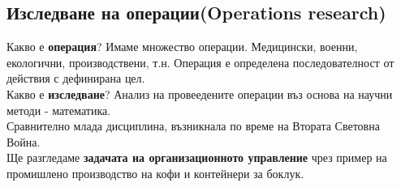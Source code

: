\documentclass[12pt, a4paper]{article}
\begin{document}
\subsection*{Изследване на операции(Operations research)}
Какво е \textbf{операция}? Имаме множество операции. Медицински, военни, екологични, производствени, т.н. Операция е определена последователност от действия с дефинирана цел.\\
Какво е \textbf{изследване}? Анализ на провеедените операции въз основа на научни методи - математика.\\
Сравнително млада дисциплина, възникнала по време на Втората Световна Война.\\
Ще разгледаме \textbf{задачата на организационното управление} чрез пример на промишлено производство на кофи и контейнери за боклук.\\
\end{document}
